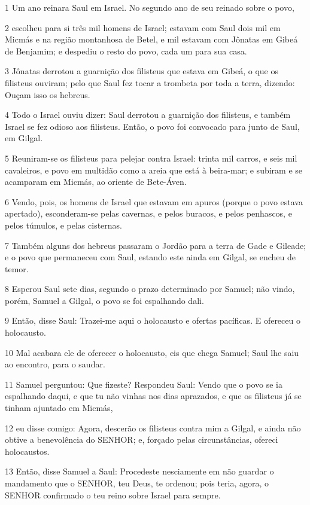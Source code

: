 \par 1 Um ano reinara Saul em Israel. No segundo ano de seu reinado sobre o povo,
\par 2 escolheu para si três mil homens de Israel; estavam com Saul dois mil em Micmás e na região montanhosa de Betel, e mil estavam com Jônatas em Gibeá de Benjamim; e despediu o resto do povo, cada um para sua casa.
\par 3 Jônatas derrotou a guarnição dos filisteus que estava em Gibeá, o que os filisteus ouviram; pelo que Saul fez tocar a trombeta por toda a terra, dizendo: Ouçam isso os hebreus.
\par 4 Todo o Israel ouviu dizer: Saul derrotou a guarnição dos filisteus, e também Israel se fez odioso aos filisteus. Então, o povo foi convocado para junto de Saul, em Gilgal.
\par 5 Reuniram-se os filisteus para pelejar contra Israel: trinta mil carros, e seis mil cavaleiros, e povo em multidão como a areia que está à beira-mar; e subiram e se acamparam em Micmás, ao oriente de Bete-Áven.
\par 6 Vendo, pois, os homens de Israel que estavam em apuros (porque o povo estava apertado), esconderam-se pelas cavernas, e pelos buracos, e pelos penhascos, e pelos túmulos, e pelas cisternas.
\par 7 Também alguns dos hebreus passaram o Jordão para a terra de Gade e Gileade; e o povo que permaneceu com Saul, estando este ainda em Gilgal, se encheu de temor.
\par 8 Esperou Saul sete dias, segundo o prazo determinado por Samuel; não vindo, porém, Samuel a Gilgal, o povo se foi espalhando dali.
\par 9 Então, disse Saul: Trazei-me aqui o holocausto e ofertas pacíficas. E ofereceu o holocausto.
\par 10 Mal acabara ele de oferecer o holocausto, eis que chega Samuel; Saul lhe saiu ao encontro, para o saudar.
\par 11 Samuel perguntou: Que fizeste? Respondeu Saul: Vendo que o povo se ia espalhando daqui, e que tu não vinhas nos dias aprazados, e que os filisteus já se tinham ajuntado em Micmás,
\par 12 eu disse comigo: Agora, descerão os filisteus contra mim a Gilgal, e ainda não obtive a benevolência do SENHOR; e, forçado pelas circunstâncias, ofereci holocaustos.
\par 13 Então, disse Samuel a Saul: Procedeste nesciamente em não guardar o mandamento que o SENHOR, teu Deus, te ordenou; pois teria, agora, o SENHOR confirmado o teu reino sobre Israel para sempre.
